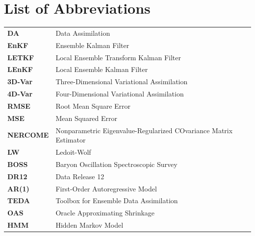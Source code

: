 \documentclass[11pt,a4paper,twoside]{MastersDoctoralThesis}
\begin{document}
\chapter*{List of Abbreviations}
\begin{tabular}{@{}ll@{}}
\textbf{DA}    & Data Assimilation \\
\textbf{EnKF}  & Ensemble Kalman Filter \\
\textbf{LETKF} & Local Ensemble Transform Kalman Filter \\
\textbf{LEnKF} & Local Ensemble Kalman Filter \\
\textbf{3D-Var} & Three-Dimensional Variational Assimilation \\
\textbf{4D-Var} & Four-Dimensional Variational Assimilation \\
\textbf{RMSE}  & Root Mean Square Error \\
\textbf{MSE}   & Mean Squared Error \\
\textbf{NERCOME} & Nonparametric Eigenvalue-Regularized COvariance Matrix Estimator \\
\textbf{LW}    & Ledoit-Wolf \\
\textbf{BOSS}  & Baryon Oscillation Spectroscopic Survey \\
\textbf{DR12}  & Data Release 12 \\
\textbf{AR(1)} & First-Order Autoregressive Model \\
\textbf{TEDA}  & Toolbox for Ensemble Data Assimilation \\
\textbf{OAS}   & Oracle Approximating Shrinkage \\
\textbf{HMM}   & Hidden Markov Model \\
\end{tabular}
\vspace{1cm}


\mainmatter
\pagestyle{fancy}










\backmatter



\end{document}
